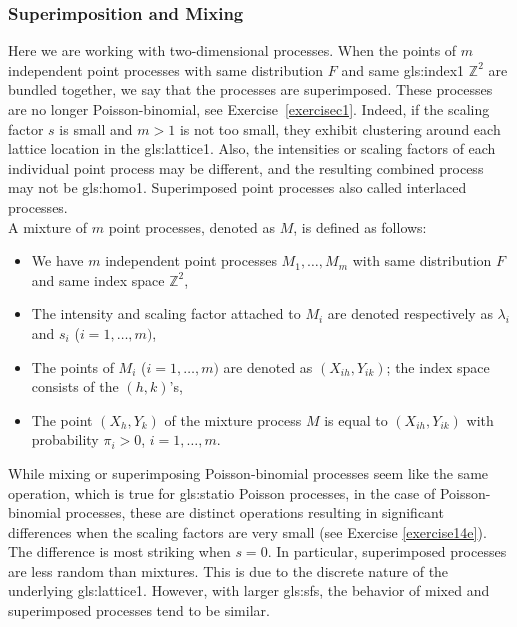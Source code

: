 \documentclass[10pt]{article}
\begin{document}
\subsubsection{Superimposition and Mixing}\label{sm1}

Here we are working with two-dimensional processes. When the points of $m$ independent point processes with same distribution $F$ 
and same \gls{gls:index1} $\mathbb{Z}^2$ are bundled together, we say that the processes are \textcolor{index}{superimposed}. These processes are no longer Poisson-binomial, see 
Exercise~\ref{exercisec1}. Indeed, if the scaling factor $s$ is small and $m>1$ is not too small, they exhibit clustering around each lattice location in the \gls{gls:lattice1}. Also, the intensities or scaling factors of each individual point process may be different, and the resulting combined process may not be \gls{gls:homo1}.
Superimposed point processes also called \textcolor{index}{interlaced} processes. \vspace{1ex} \\
A \textcolor{index}{mixture} of $m$ point processes, denoted as $M$, is defined as follows: 
\begin{itemize}
\item We have $m$ independent point processes $M_1,\dots,M_m$ with same distribution $F$ and same index space $\mathbb{Z}^2$,
\item The intensity and scaling factor attached to $M_i$ are denoted respectively as $\lambda_i$ and $s_i$ ($i=1,\dots,m)$, 
\item The points of $M_i$ ($i=1,\dots,m)$ are denoted as $(X_{ih},Y_{ik})$; the index space consists of the $(h,k)$'s,
\item The point $(X_h,Y_k)$ of the mixture process $M$ is equal to $(X_{ih},Y_{ik})$ with probability $\pi_i > 0$, $i=1,\dots,m$.
\end{itemize} 

\noindent While mixing or superimposing Poisson-binomial processes seem like the same operation, which is true for \gls{gls:statio} Poisson processes, in the case of 
Poisson-binomial processes, these are distinct operations resulting in significant differences  when the scaling factors are very small (see Exercise \ref{exercise14e}). The difference
is most striking when $s=0$. In particular,
superimposed processes are less random than mixtures. This is due to the discrete nature of the underlying 
\gls{gls:lattice1}. However, with larger \glspl{gls:sf}, the behavior of mixed and superimposed processes tend to be similar. 
\end{document}
